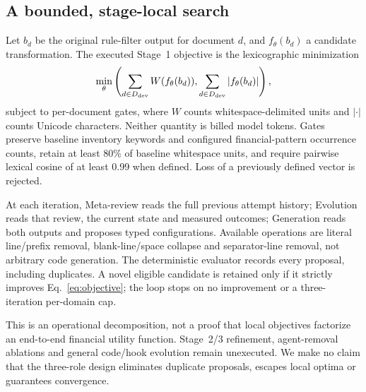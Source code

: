 \documentclass[11pt]{article}
\begin{document}
\subsection{A bounded, stage-local search}
Let $b_d$ be the original rule-filter output for document $d$, and
$f_\theta(b_d)$ a candidate transformation. The executed Stage~1 objective is
the lexicographic minimization
\begin{equation}
 \min_\theta \left(
 \sum_{d\in D_{\rm dev}} W(f_\theta(b_d)),
 \sum_{d\in D_{\rm dev}} |f_\theta(b_d)|
 \right),
 \label{eq:objective}
\end{equation}
subject to per-document gates, where $W$ counts whitespace-delimited units
and $|\cdot|$ counts Unicode characters. Neither quantity is billed model
tokens. Gates preserve baseline inventory keywords and configured
financial-pattern occurrence counts, retain at least 80\% of baseline
whitespace units, and require pairwise lexical cosine of at least 0.99
when defined. Loss of a previously defined vector is rejected.

At each iteration, Meta-review reads the full previous attempt history;
Evolution reads that review, the current state and measured outcomes;
Generation reads both outputs and proposes typed configurations.
Available operations are literal line/prefix removal, blank-line/space
collapse and separator-line removal, not arbitrary code generation.
The deterministic evaluator records every proposal, including duplicates.
A novel eligible candidate is retained only if it strictly improves
Eq.~\ref{eq:objective}; the loop stops on no improvement or a
three-iteration per-domain cap.

This is an operational decomposition, not a proof that local objectives
factorize an end-to-end financial utility function. Stage~2/3 refinement,
agent-removal ablations and general code/hook evolution remain unexecuted.
We make no claim that the three-role design eliminates duplicate proposals,
escapes local optima or guarantees convergence.
\end{document}
